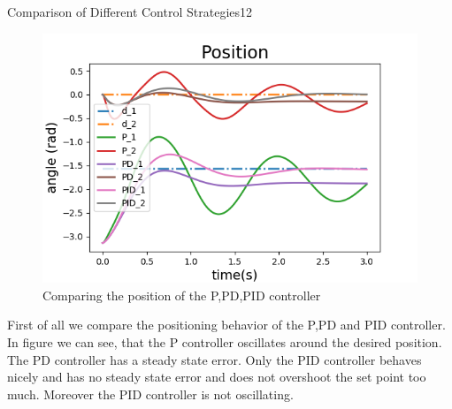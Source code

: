 \begin{questions}
\begin{question}{Comparison of Different Control Strategies}{12}
\begin{answer}
\begin{minipage}{0.7\textwidth}
	\begin{figure}[H]
		\includegraphics[width=1\textwidth]{img/2cpos1.png} 
		\caption{\label{fig:2cpos1} Comparing the position of the P,PD,PID controller}
	\end{figure}
\end{minipage} \hfill
\begin{minipage}{0.25\textwidth}
	First of all we compare the positioning behavior of the P,PD and PID controller. In figure \label{fig:2cpos1} we can see, that the P controller oscillates around the desired position. The PD controller has a steady state error. Only the PID controller behaves nicely and has no steady state error and does not overshoot the set point too much. Moreover the PID controller is not oscillating.
\end{minipage}


\end{answer}
\end{question}
\end{questions}
